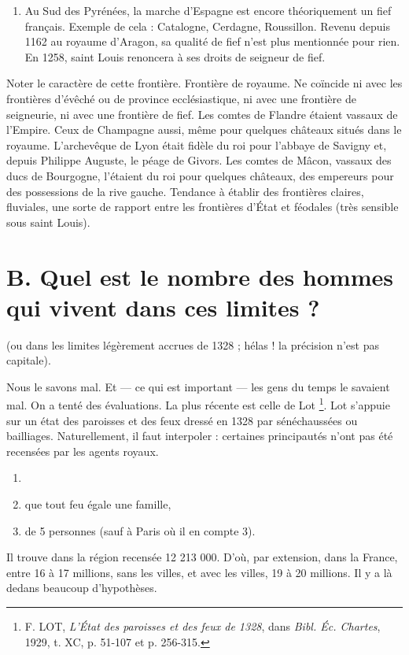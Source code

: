 \documentclass[french,twoside]{book} %
\begin{document}
\begin{enumerate}[itemsep=0pt,]
\item Au Sud des Pyrénées, la marche d’Espagne est encore théoriquement un fief français. Exemple de cela : Catalogne, Cerdagne, Roussillon. Revenu depuis 1162 au royaume d’Aragon, sa qualité de fief n’est plus mentionnée pour rien. En 1258, saint Louis renoncera à ses droits de seigneur de fief.

\end{enumerate}\noindent Noter le caractère de cette frontière. Frontière de royaume. Ne coïncide ni avec les frontières d’évêché ou de province ecclésiastique, ni avec une frontière de seigneurie, ni avec une frontière de fief. Les comtes de Flandre étaient vassaux de l’Empire. Ceux de Champagne aussi, même pour quelques châteaux situés dans le royaume. L’archevêque de Lyon était fidèle du roi pour l’abbaye de Savigny et, depuis Philippe Auguste, le péage de Givors. Les comtes de Mâcon, vassaux des ducs de Bourgogne, l’étaient du roi pour quelques châteaux, des empereurs pour des possessions de la rive gauche. Tendance à établir des frontières claires, fluviales, une sorte de rapport entre les frontières d’État et féodales (très sensible sous saint Louis).
\section[B. Quel est le nombre des hommes qui vivent dans ces limites ?]{B. Quel est le nombre des hommes qui vivent dans ces limites ?}
\label{c02b}
\noindent (ou dans les limites légèrement accrues de 1328 ; hélas ! la précision n’est pas capitale).\par
Nous le savons mal. Et — ce qui est important — les gens du temps le savaient mal. On a tenté des évaluations. La plus récente est celle de Lot \footnote{F. LOT, {\itshape L’État des paroisses et des feux de 1328}, dans {\itshape Bibl. Éc. Chartes}, 1929, t. XC, p. 51-107 et p. 256-315.}. Lot s’appuie sur un état des paroisses et des feux dressé en 1328 par sénéchaussées ou bailliages. Naturellement, il faut interpoler : certaines principautés n’ont pas été recensées par les agents royaux.\par

\begin{enumerate}[itemsep=0pt,]
\item[] \hspace{-1.5em}{\bfseries Lot suppose :}
\item que tout feu égale une famille,
\item de 5 personnes (sauf à Paris où il en compte 3).

\end{enumerate}\noindent Il trouve dans la région recensée 12 213 000. D’où, par extension, dans la France, entre 16 à 17 millions, sans les villes, et avec les villes, 19 à 20 millions. Il y a là dedans beaucoup d’hypothèses.\par
\end{document}
